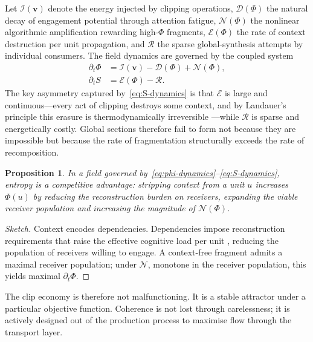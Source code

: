 \documentclass{amsart}
\theoremstyle{plain}
\newtheorem{proposition}[theorem]{Proposition}
\theoremstyle{definition}
\theoremstyle{remark}
\newcommand{\scalar}{\Phi}
\newcommand{\vfield}{\mathbf{v}}
\newcommand{\entr}{S}
\newcommand{\Inj}{\mathcal{I}}
\newcommand{\Dec}{\mathcal{D}}
\newcommand{\Amp}{\mathcal{N}}
\newcommand{\Ectx}{\mathcal{E}}
\newcommand{\Rec}{\mathcal{R}}
\begin{document}
Let $\Inj(\vfield)$ denote the energy injected by clipping operations,
$\Dec(\scalar)$ the natural decay of engagement potential through attention fatigue,
$\Amp(\scalar)$ the nonlinear algorithmic amplification rewarding high-$\scalar$
fragments, $\Ectx(\scalar)$ the rate of context destruction per unit propagation,
and $\Rec$ the sparse global-synthesis attempts by individual consumers.  The field
dynamics are governed by the coupled system
\begin{align}
  \label{eq:phi-dynamics}
  \partial_t \scalar &= \Inj(\vfield) - \Dec(\scalar) + \Amp(\scalar), \\
  \label{eq:S-dynamics}
  \partial_t \entr   &= \Ectx(\scalar) - \Rec.
\end{align}
The key asymmetry captured by~\eqref{eq:S-dynamics} is that $\Ectx$ is large and
continuous---every act of clipping destroys some context, and by Landauer's
principle this erasure is thermodynamically irreversible \cite{landauer1961}---while
$\Rec$ is sparse and energetically costly.  Global sections therefore fail to form
not because they are impossible but because the rate of fragmentation structurally
exceeds the rate of recomposition.

\begin{proposition}
  \label{prop:entropy-advantage}
  In a field governed by~\eqref{eq:phi-dynamics}--\eqref{eq:S-dynamics}, entropy
  is a competitive advantage: stripping context from a unit $u$ increases
  $\scalar(u)$ by reducing the reconstruction burden on receivers, expanding the
  viable receiver population and increasing the magnitude of $\Amp(\scalar)$.
\end{proposition}

\begin{proof}[Sketch]
  Context encodes dependencies.  Dependencies impose reconstruction requirements
  that raise the effective cognitive load per unit \cite{kirschner2006}, reducing
  the population of receivers willing to engage.  A context-free fragment admits a
  maximal receiver population; under $\Amp$, monotone in the receiver population,
  this yields maximal $\partial_t \scalar$.
\end{proof}

The clip economy is therefore not malfunctioning.  It is a stable attractor under
a particular objective function.  Coherence is not lost through carelessness; it is
actively designed out of the production process to maximise flow through the
transport layer.

\end{document}
